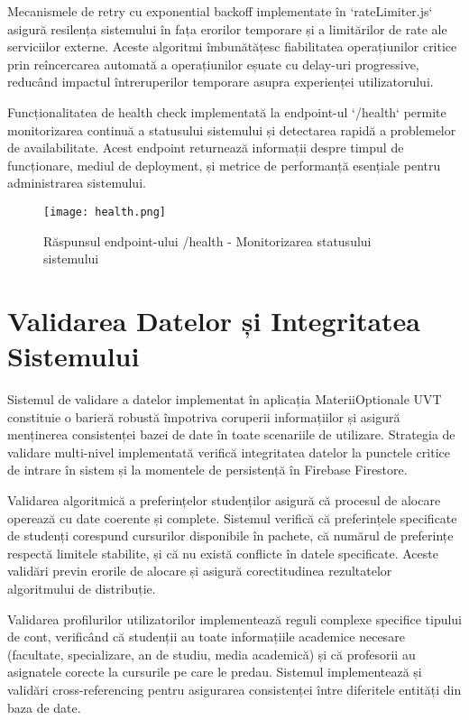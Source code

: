 \documentclass[12pt,a4paper]{report}
\begin{document}
Mecanismele de retry cu exponential backoff implementate în `rateLimiter.js` asigură resilența sistemului în fața erorilor temporare și a limitărilor de rate ale serviciilor externe. Aceste algoritmi îmbunătățesc fiabilitatea operațiunilor critice prin reîncercarea automată a operațiunilor eșuate cu delay-uri progressive, reducând impactul întreruperilor temporare asupra experienței utilizatorului.

Funcționalitatea de health check implementată la endpoint-ul `/health` permite monitorizarea continuă a statusului sistemului și detectarea rapidă a problemelor de availabilitate. Acest endpoint returnează informații despre timpul de funcționare, mediul de deployment, și metrice de performanță esențiale pentru administrarea sistemului.

\begin{figure}[H]
\centering
\texttt{[image: health.png]}
\caption{Răspunsul endpoint-ului /health - Monitorizarea statusului sistemului}
\label{fig:health-endpoint}
\end{figure}

\section{Validarea Datelor și Integritatea Sistemului}

Sistemul de validare a datelor implementat în aplicația MateriiOptionale UVT constituie o barieră robustă împotriva coruperii informațiilor și asigură menținerea consistenței bazei de date în toate scenariile de utilizare. Strategia de validare multi-nivel implementată verifică integritatea datelor la punctele critice de intrare în sistem și la momentele de persistență în Firebase Firestore.

Validarea algoritmică a preferințelor studenților asigură că procesul de alocare operează cu date coerente și complete. Sistemul verifică că preferințele specificate de studenți corespund cursurilor disponibile în pachete, că numărul de preferințe respectă limitele stabilite, și că nu există conflicte în datele specificate. Aceste validări previn erorile de alocare și asigură corectitudinea rezultatelor algoritmului de distribuție.

Validarea profilurilor utilizatorilor implementează reguli complexe specifice tipului de cont, verificând că studenții au toate informațiile academice necesare (facultate, specializare, an de studiu, media academică) și că profesorii au asignatele corecte la cursurile pe care le predau. Sistemul implementează și validări cross-referencing pentru asigurarea consistenței între diferitele entități din baza de date.
\end{document}
